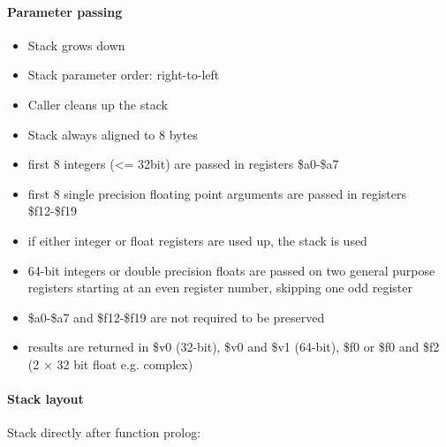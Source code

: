 \paragraph{Parameter passing}

\begin{itemize}
\item Stack grows down
\item Stack parameter order: right-to-left
\item Caller cleans up the stack
\item Stack always aligned to 8 bytes
\item first 8 integers (<= 32bit) are passed in registers \$a0-\$a7
\item first 8 single precision floating point arguments are passed in registers \$f12-\$f19
\item if either integer or float registers are used up, the stack is used
\item 64-bit integers or double precision floats are passed on two general purpose registers starting at an even register number, skipping one odd register
\item \$a0-\$a7 and \$f12-\$f19 are not required to be preserved
\item results are returned in \$v0 (32-bit), \$v0 and \$v1 (64-bit), \$f0 or \$f0 and \$f2 (2 $\times$ 32 bit float e.g. complex)
\end{itemize}

\paragraph{Stack layout}

Stack directly after function prolog:\\

